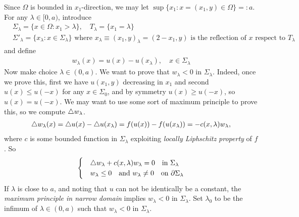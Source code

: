 \documentclass[12pt,a4paper]{article}
\newenvironment{proof}
{\begin{changemargin}{1cm}{0.5cm} 
	}%
	{\end{changemargin}
}
\newenvironment{p}
{\begin{proof} 
	}%
	{\end{proof}
}
\begin{document}
\begin{p}
\pf Since $\Omega$ is bounded in $x_1$-direction, we may let $\sup \{x_1 : x= (x_1, y) \in\Omega \} =: a$. For any $\lambda \in [0, a)$, introduce
\begin{align*}
& \Sigma_{\lambda} = \{x\in \Omega : x_1 > \lambda \}, \quad T_{\lambda} = \{x_1 = \lambda \}\\
& \Sigma'_{\lambda} = \{ x_{\lambda} : x \in \Sigma_{\lambda} \} \,\, \text{where } x_{\lambda} \equiv (x_1, y)_{\lambda} = (2-x_1, y) \text{ is the reflection of } x \text{ respect to } T_{\lambda}
\end{align*}
and define 
\begin{align*}
w_{\lambda}(x) = u(x) - u(x_{\lambda}), \quad x\in \Sigma_{\lambda}
\end{align*}
Now make choice $\lambda \in (0, a)$. We want to prove that $w_{\lambda}<0$ in $\Sigma_{\lambda}$. Indeed, once we prove this, first we have $u(x_1, y)$ decreasing in $x_1$ and second $u(x) \leq u(-x)$ for any $x\in \Sigma_{0}$, and by symmetry $u(x) \geq u(-x)$, so $u(x) = u(-x)$. We may want to use some sort of maximum principle to prove this, so we compute $\triangle w_{\lambda}$.
\begin{align*}
\triangle w_{\lambda}(x) = \triangle u(x) - \triangle u(x_{\lambda}) = f(u(x))- f(u(x_{\lambda})) = -c(x,\lambda) w_{\lambda},
\end{align*}
where $c$ is some bounded function in $\Sigma_{\lambda}$ exploiting \emph{locally Liphschitz property} of $f$. So
\begin{align*}
\begin{cases}
& \triangle w_{\lambda} + c(x, \lambda)w_{\lambda} =0 \quad \text{in } \Sigma_{\lambda} \\
& w_{\lambda} \leq 0 \quad \text{and } w_{\lambda} \neq 0 \quad \text{on } \partial \Sigma_{\lambda}
\end{cases}
\end{align*}
If $\lambda$ is close to $a$, and noting that $u$ can not be identically be a constant, the \emph{maximum principle in narrow domain} implies $w_{\lambda}<0$ in $\Sigma_{\lambda}$. Set $\lambda_0$ to be the infimum of $\lambda \in (0, a)$ such that $w_{\lambda}<0$ in $\Sigma_{\lambda}$.


\end{p}
\end{document}
